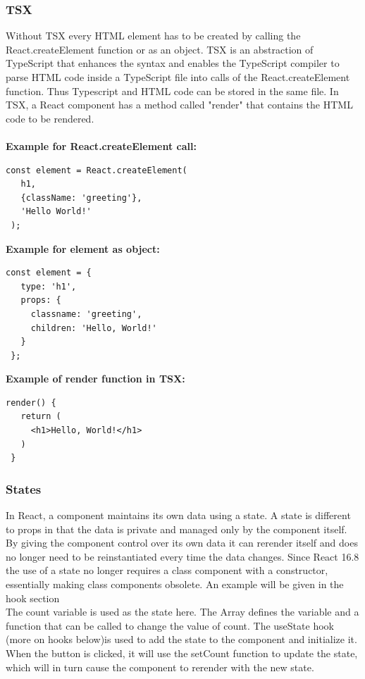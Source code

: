 \subsubsection{TSX}
Without TSX every HTML element has to be created by calling the React.createElement function or as an object. TSX is an abstraction of TypeScript that enhances the syntax and enables the TypeScript compiler to parse HTML code inside a TypeScript file into calls of the React.createElement function. Thus Typescript and HTML code can be stored in the same file. In TSX, a React component has a method called "render" that contains the HTML code to be rendered.\\\\
\textbf{Example for React.createElement call:}
\begin{Verbatim}[frame=single]
 const element = React.createElement(
   h1,
   {className: 'greeting'},
   'Hello World!'
 );
\end{Verbatim}
\pagebreak
\textbf{Example for element as object:}
\begin{Verbatim}[frame=single]
 const element = {
   type: 'h1',
   props: {
     classname: 'greeting',
     children: 'Hello, World!'
   }
 };
\end{Verbatim}
\textbf{Example of render function in TSX:}
\begin{Verbatim}[frame=single]
 render() {
   return (
     <h1>Hello, World!</h1>
   )    
 }
\end{Verbatim}
\subsubsection{States}
In React, a component maintains its own data using a state. A state is different to props in that the data is private and managed only by the component itself.
By giving the component control over its own data it can rerender itself and does no longer need to be reinstantiated every time the data changes. Since React 16.8 the use of a state no longer requires a class component with a constructor, essentially making class components obsolete. An example will be given in the hook section\\

The count variable is used as the state here. The Array defines the variable and a function that can be called to change the value of count. The useState hook (more on hooks below)is used to add the state to the component and initialize it. When the button is clicked, it will use the setCount function to update the state, which will in turn cause the component to rerender with the new state.
\pagebreak
